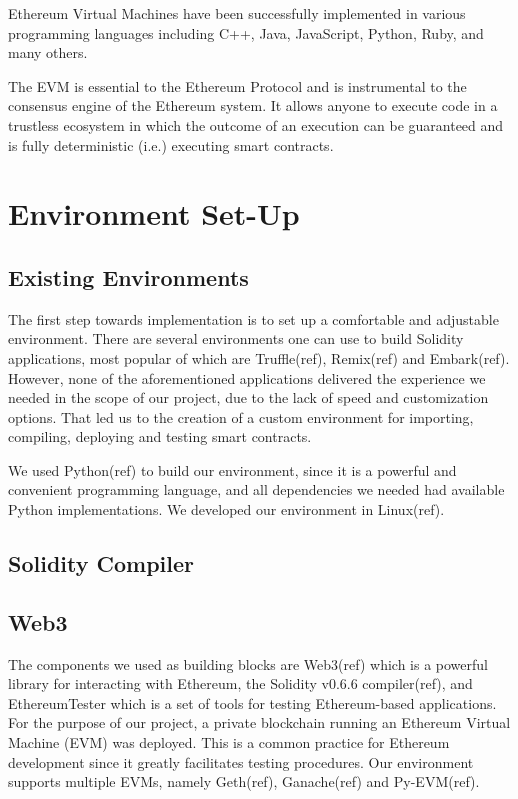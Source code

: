 Ethereum Virtual Machines have been successfully implemented in
various programming languages including C++, Java, JavaScript, Python,
Ruby, and many others.

The EVM is essential to the Ethereum Protocol and is instrumental to
the consensus engine of the Ethereum system. It allows anyone to
execute code in a trustless ecosystem in which the outcome of an
execution can be guaranteed and is fully deterministic (i.e.)
executing smart contracts.

\section{Environment Set-Up}

\subsection{Existing Environments}

The first step towards implementation is to set up a comfortable and adjustable
environment. There are several environments one can use to build Solidity
applications, most popular of which are Truffle(ref), Remix(ref) and
Embark(ref). However, none of the aforementioned applications delivered the
experience we needed in the scope of our project, due to the lack of speed and
customization options. That led us to the creation of a custom environment for
importing, compiling, deploying and testing smart contracts.

We used Python(ref) to build our environment, since it is a powerful and
convenient programming language, and all dependencies we needed had available
Python implementations. We developed our environment in Linux(ref).

\subsection{Solidity Compiler}

\subsection{Web3}

The components we used as building blocks are Web3(ref) which is a powerful
library for interacting with Ethereum, the Solidity v0.6.6 compiler(ref), and
EthereumTester which is a set of tools for testing Ethereum-based applications.
For the purpose of our project, a private blockchain running an Ethereum
Virtual Machine (EVM) was deployed.  This is a common practice for Ethereum
development since it greatly facilitates testing procedures. Our environment
supports multiple EVMs, namely Geth(ref), Ganache(ref) and Py-EVM(ref).

